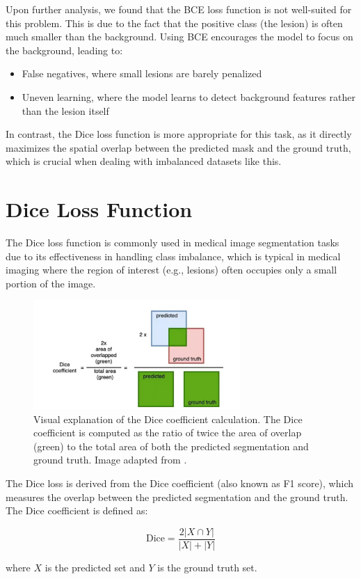 Upon further analysis, we found that the BCE loss function is not well-suited for this problem. This is due to the fact that the positive class (the lesion) is often much smaller than the background. Using BCE encourages the model to focus on the background, leading to:

\begin{itemize}
    \item False negatives, where small lesions are barely penalized
    \item Uneven learning, where the model learns to detect background features rather than the lesion itself
\end{itemize}

In contrast, the Dice loss function is more appropriate for this task, as it directly maximizes the spatial overlap between the predicted mask and the ground truth, which is crucial when dealing with imbalanced datasets like this.

\section{Dice Loss Function}
\label{sec:dice_loss}

The Dice loss function is commonly used in medical image segmentation tasks due to its effectiveness in handling class imbalance, which is typical in medical imaging where the region of interest (e.g., lesions) often occupies only a small portion of the image.

\begin{figure}[htbp]
    \centering
    \includegraphics[width=0.7\textwidth]{figures/dice_loss_illustration.png}
    \caption{Visual explanation of the Dice coefficient calculation. The Dice coefficient is computed as the ratio of twice the area of overlap (green) to the total area of both the predicted segmentation and ground truth. Image adapted from \cite{nevilledice2023}.}
    \label{fig:dice_illustration}
\end{figure}

The Dice loss is derived from the Dice coefficient (also known as F1 score), which measures the overlap between the predicted segmentation and the ground truth. The Dice coefficient is defined as:

\begin{equation}
\text{Dice} = \frac{2 |X \cap Y|}{|X| + |Y|}
\end{equation}

where $X$ is the predicted set and $Y$ is the ground truth set. 

